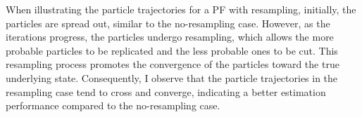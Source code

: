   When illustrating the particle trajectories for a PF with resampling, initially, the particles are spread out, similar to the no-resampling case. However, as the iterations progress, the particles undergo resampling, which allows the more probable particles to be replicated and the less probable ones to be cut. This resampling process promotes the convergence of the particles toward the true underlying state. Consequently, I observe that the particle trajectories in the resampling case tend to cross and converge, indicating a better estimation performance compared to the no-resampling case. 